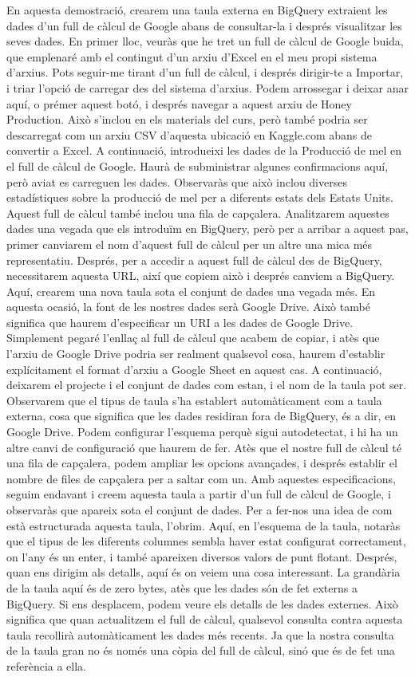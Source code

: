 \documentclass[12pt,longbibliography]{article}
\theoremstyle{definition}
\theoremstyle{remark}
\begin{document}
En aquesta demostració, crearem una taula externa en BigQuery extraient les dades d'un full de càlcul de Google abans de consultar-la i després visualitzar les seves dades. En primer lloc, veuràs que he tret un full de càlcul de Google buida, que emplenaré amb el contingut d'un arxiu d'Excel en el meu propi sistema d'arxius. Pots seguir-me tirant d'un full de càlcul, i després dirigir-te a Importar, i triar l'opció de carregar des del sistema d'arxius. Podem arrossegar i deixar anar aquí, o prémer aquest botó, i després navegar a aquest arxiu de Honey Production. Això s'inclou en els materials del curs, però també podria ser descarregat com un arxiu CSV d'aquesta ubicació en Kaggle.com abans de convertir a Excel. A continuació, introdueixi les dades de la Producció de mel en el full de càlcul de Google. Haurà de subministrar algunes confirmacions aquí, però aviat es carreguen les dades. Observaràs que això inclou diverses estadístiques sobre la producció de mel per a diferents estats dels Estats Units. Aquest full de càlcul també inclou una fila de capçalera. Analitzarem aquestes dades una vegada que els introduïm en BigQuery, però per a arribar a aquest pas, primer canviarem el nom d'aquest full de càlcul per un altre una mica més representatiu. Després, per a accedir a aquest full de càlcul des de BigQuery, necessitarem aquesta URL, així que copiem això i després canviem a BigQuery. Aquí, crearem una nova taula sota el conjunt de dades una vegada més. En aquesta ocasió, la font de les nostres dades serà Google Drive. Això també significa que haurem d'especificar un URI a les dades de Google Drive. Simplement pegaré l'enllaç al full de càlcul que acabem de copiar, i atès que l'arxiu de Google Drive podria ser realment qualsevol cosa, haurem d'establir explícitament el format d'arxiu a Google Sheet en aquest cas. A continuació, deixarem el projecte i el conjunt de dades com estan, i el nom de la taula pot ser. Observarem que el tipus de taula s'ha establert automàticament com a taula externa, cosa que significa que les dades residiran fora de BigQuery, és a dir, en Google Drive. Podem configurar l'esquema perquè sigui autodetectat, i hi ha un altre canvi de configuració que haurem de fer. Atès que el nostre full de càlcul té una fila de capçalera, podem ampliar les opcions avançades, i després establir el nombre de files de capçalera per a saltar com un. Amb aquestes especificacions, seguim endavant i creem aquesta taula a partir d'un full de càlcul de Google, i observaràs que apareix sota el conjunt de dades. Per a fer-nos una idea de com està estructurada aquesta taula, l'obrim. Aquí, en l'esquema de la taula, notaràs que el tipus de les diferents columnes sembla haver estat configurat correctament, on l'any és un enter, i també apareixen diversos valors de punt flotant. Després, quan ens dirigim als detalls, aquí és on veiem una cosa interessant. La grandària de la taula aquí és de zero bytes, atès que les dades són de fet externs a BigQuery. Si ens desplacem, podem veure els detalls de les dades externes. Això significa que quan actualitzem el full de càlcul, qualsevol consulta contra aquesta taula recollirà automàticament les dades més recents. Ja que la nostra consulta de la taula gran no és només una còpia del full de càlcul, sinó que és de fet una referència a ella. 
\end{document}
